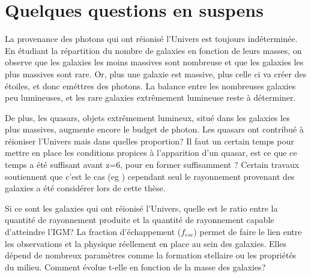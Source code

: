 \section{Quelques questions en suspens}



La provenance des photons qui ont réionisé l'Univers est toujours indéterminée.
En étudiant la répartition du nombre de galaxies en fonction de leurs masses, on observe que les galaxies les moins massives sont nombreuse et que les galaxies les plus massives sont rare.
Or, plus une galaxie est massive, plus celle ci va créer des étoiles, et donc eméttres des photons.
La balance entre les nombreuses galaxies peu lumineuses, et les rare galaxies extrêmement lumineuse reste à déterminer.

De plus, les quasars, objets extrêmement lumineux, situé dans les galaxies les plus massives, augmente encore le budget de photon.
Les quasars ont contribué à réioniser l'Univers mais dans quelles proportion?
Il faut un certain temps pour mettre en place les conditions propices à l'apparition d'un quasar, est ce que ce temps a été suffisant avant z=6, pour en former suffisamment ?
Certain travaux soutiennent que c'est le cas (eg \cite{chardin_large-scale_2017}) cependant seul le rayonnement provenant des galaxies a été considérer lors de cette thèse.

Si ce sont les galaxies qui ont réionisé l'Univers, quelle est le ratio entre la quantité de rayonnement produite et la quantité de rayonnement capable d'atteindre l'\ac{IGM}?
La fraction d'échappement ($f_{esc}$) permet de faire le lien entre les observations et la physique réellement en place au sein des galaxies.
Elles dépend de nombreux paramètres comme la formation stellaire ou les propriétés du milieu.
Comment évolue t-elle en fonction de la masse des galaxies? 


